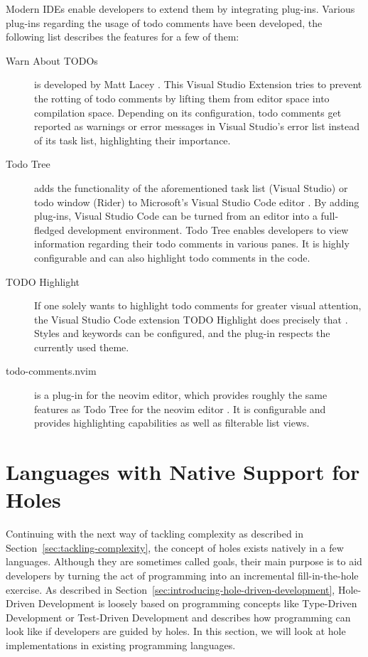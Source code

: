 Modern IDEs enable developers to extend them by integrating plug-ins.
Various plug-ins regarding the usage of todo comments have been developed, the following list describes the features for a few of them:
\begin{description}
  \item[Warn About TODOs] is developed by Matt Lacey \cite{lacey_warn_2023}. This Visual Studio Extension tries to prevent the rotting of todo comments by lifting them from editor space into compilation space. Depending on its configuration, todo comments get reported as warnings or error messages in Visual Studio's error list instead of its task list, highlighting their importance.
  \item[Todo Tree] adds the functionality of the aforementioned task list (Visual Studio) or todo window (Rider) to Microsoft's Visual Studio Code editor \cite{scott_todo_2023}. By adding plug-ins, Visual Studio Code can be turned from an editor into a full-fledged development environment. Todo Tree enables developers to view information regarding their todo comments in various panes. It is highly configurable and can also highlight todo comments in the code.
  \item[TODO Highlight] If one solely wants to highlight todo comments for greater visual attention, the Visual Studio Code extension TODO Highlight does precisely that \cite{wayou_vscode_2023}. Styles and keywords can be configured, and the plug-in respects the currently used theme.
  \item[todo-comments.nvim] is a plug-in for the neovim editor, which provides roughly the same features as Todo Tree for the neovim editor \cite{lemaitre_todo_2023}. It is configurable and provides highlighting capabilities as well as filterable list views.
\end{description}


\section{Languages with Native Support for Holes}
\label{sec:languages-with-native-holes-support}
Continuing with the next way of tackling complexity as described in Section~\ref{sec:tackling-complexity}, the concept of holes exists natively in a few languages.
Although they are sometimes called goals, their main purpose is to aid developers by turning the act of programming into an incremental fill-in-the-hole exercise.
As described in Section~\ref{sec:introducing-hole-driven-development}, Hole-Driven Development is loosely based on programming concepts like Type-Driven Development \cite{brady_type-driven_2017} or Test-Driven Development \cite{mccracken_digital_1957} and describes how programming can look like if developers are guided by holes.
In this section, we will look at hole implementations in existing programming languages.

